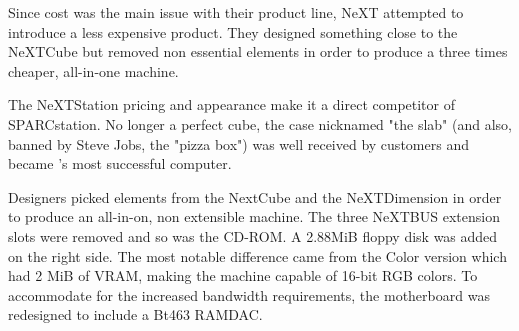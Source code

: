 Since cost was the main issue with their product line, NeXT attempted to introduce a less expensive product. They designed something close to the NeXTCube but removed non essential elements in order to produce a three times cheaper, all-in-one machine.\\
\par
The NeXTStation pricing and appearance make it a direct competitor of SPARCstation. No longer a perfect cube, the case nicknamed "the slab" (and also, banned by Steve Jobs, the "pizza box") was well received by customers and became \NeXTns{}'s most successful computer.\\
\par 
{}
\par
\vspace{-10pt}
Designers picked elements from the NextCube and the NeXTDimension in order to produce an all-in-on, non extensible machine. The three NeXTBUS extension slots were removed and so was the CD-ROM. A 2.88MiB floppy disk was added on the right side. The most notable difference came from the Color version which had 2 MiB of VRAM, making the machine capable of 16-bit RGB colors. To accommodate for the increased bandwidth requirements, the motherboard was redesigned to include a Bt463 RAMDAC.\\
\par



